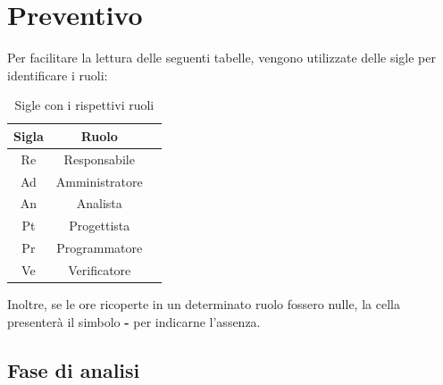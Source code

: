 \section{Preventivo}
Per facilitare la lettura delle seguenti tabelle, vengono utilizzate delle sigle 
per identificare i ruoli:

\begin{table}[H]
		\begin{center}
			\setlength{\aboverulesep}{0pt}
			\setlength{\belowrulesep}{0pt}
			\setlength{\extrarowheight}{.75ex}
			\begin{tabular}{ c c c }
				\rowcolor{AzzurroGruppo!30} 
				\textbf{Sigla} & \textbf{Ruolo} \\
				\toprule
				Re & Responsabile \\
				Ad & Amministratore\\
				An & Analista\\
				Pt & Progettista\\
				Pr & Programmatore\\
				Ve & Verificatore\\
				\bottomrule
			\end{tabular}
			\caption{Sigle con i rispettivi ruoli}
		\end{center}
	\end{table}
\noindent
Inoltre, se le ore ricoperte in un determinato ruolo fossero nulle, la cella 
presenterà il simbolo \textbf{-} per indicarne l'assenza. 

\subsection{Fase di analisi}
